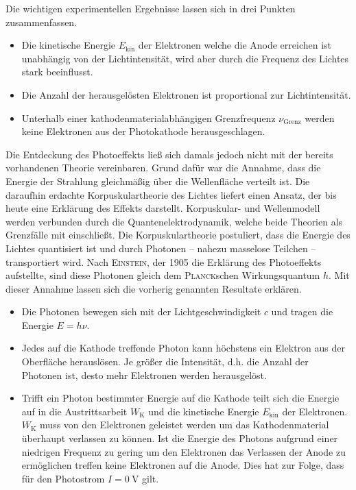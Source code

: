Die wichtigen experimentellen Ergebnisse lassen sich in drei Punkten zusammenfassen.

\begin{itemize}
	\item Die kinetische Energie $E_\mathup{kin}$ der Elektronen welche die Anode erreichen ist unabhängig von der Lichtintensität, wird aber durch die Frequenz des Lichtes stark beeinflusst.
	\item Die Anzahl der herausgelösten Elektronen ist proportional zur Lichtintensität.
	\item Unterhalb einer kathodenmaterialabhängigen Grenzfrequenz $\nu_\mathup{Grenz}$ werden keine Elektronen aus der Photokathode herausgeschlagen.
\end{itemize}

Die Entdeckung des Photoeffekts ließ sich damals jedoch nicht mit der bereits vorhandenen Theorie vereinbaren.
 Grund dafür war die Annahme, dass die Energie der Strahlung gleichmäßig über die Wellenfläche verteilt ist.
Die daraufhin erdachte Korpuskulartheorie des Lichtes liefert einen Ansatz, der bis heute eine Erklärung des Effekts darstellt. Korpuskular- und Wellenmodell werden verbunden durch die Quantenelektrodynamik, welche beide Theorien als Grenzfälle mit einschließt. 
Die Korpuskulartheorie postuliert, dass die Energie des Lichtes quantisiert ist und durch Photonen -- nahezu masselose Teilchen -- transportiert wird. 
Nach \textsc{Einstein}, der 1905 die Erklärung des Photoeffekts aufstellte, sind diese Photonen gleich dem \textsc{Planck}schen Wirkungsquantum $h$. 
Mit dieser Annahme lassen sich die vorherig genannten Resultate erklären.

\begin{itemize}
	\item Die Photonen bewegen sich mit der Lichtgeschwindigkeit $c$ und tragen die Energie  $E=h\nu$.
	\item Jedes auf die Kathode treffende Photon kann höchstens ein Elektron aus der Oberfläche herauslösen. Je größer die Intensität, d.h. die Anzahl der Photonen ist, desto mehr Elektronen werden herausgelöst.
	\item Trifft ein Photon bestimmter Energie auf die Kathode teilt sich die Energie auf in die Austrittsarbeit $W_\mathup{K}$ und die kinetische Energie $E_\mathup{kin}$ der Elektronen. $W_\mathup{K}$ muss von den Elektronen geleistet werden um das Kathodenmaterial überhaupt verlassen zu können. Ist die Energie des Photons aufgrund einer niedrigen Frequenz zu gering um den Elektronen das Verlassen der Anode zu ermöglichen treffen keine Elektronen auf die Anode. Dies hat zur Folge, dass für den Photostrom $I=\SI{0}{\volt}$ gilt.
\end{itemize}

